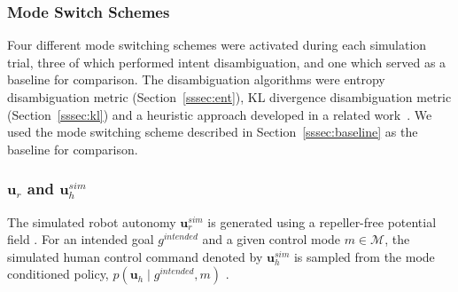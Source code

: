 \documentclass[letterpaper, 10 pt, conference]{ieeeconf}  %
\newcommand{\argmax}{\arg\!\max}
\begin{document}
\subsubsection{Mode Switch Schemes}
Four different mode switching schemes were activated during each simulation trial, three of which performed intent disambiguation, and one which served as a baseline for comparison. The disambiguation algorithms were entropy disambiguation  metric (Section~\ref{sssec:ent}), KL divergence disambiguation metric (Section~\ref{sssec:kl}) and a heuristic approach developed in a related work~\cite{gopinath2017mode}. We used the mode switching scheme described in Section~\ref{sssec:baseline} as the baseline for comparison. 
\subsubsection{$\boldsymbol{u}_r$ and $\boldsymbol{u}_h^{sim}$}
The simulated robot autonomy $\boldsymbol{u}^{sim}_r$ is generated using a repeller-free potential field . For an intended goal $g^{intended}$ and a given control mode $m \in \mathcal{M}$, the simulated human control command denoted by $\boldsymbol{u}^{sim}_h$ is sampled from the mode conditioned policy, $p(\boldsymbol{u}_h\;|\;g^{intended}, m)$ . 
\end{document}
